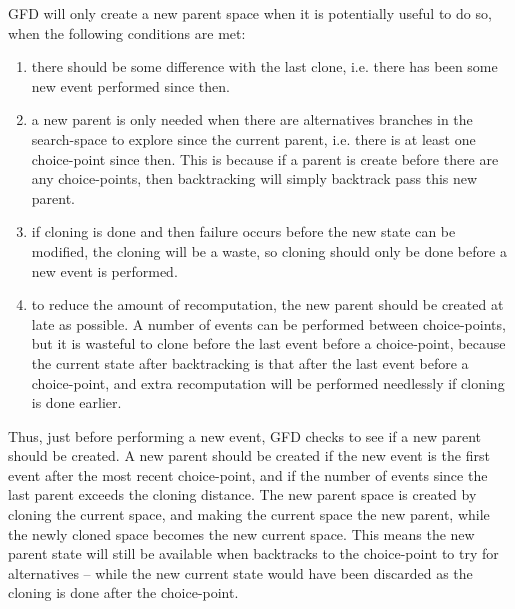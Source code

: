 GFD will only create a new parent space when it is potentially useful
 to do so, when the following conditions are met:

\begin{enumerate}
\item there should be some difference with the last clone, i.e. 
there has been some new event performed since then. 
\item a new parent is only needed when there are alternatives branches 
in the search-space to explore since the current parent, i.e.
there is at least one choice-point since then. This is because if a
 parent is create before there are any choice-points, then backtracking will simply 
backtrack pass this new parent.
\item if cloning is done and then failure
occurs before the new state can be modified, the cloning will be a waste, so
cloning should only be done before a new event is performed.
\item to reduce the amount of recomputation, the new parent should be created
at late as possible. A number of events can be performed between choice-points,
but it is wasteful to clone before the last event before a choice-point, 
because the current state after backtracking is that after the last event before a choice-point,
and extra recomputation will be performed needlessly if cloning is done earlier.
\end{enumerate}

Thus, just before performing a new event, GFD checks to see if a new
 parent should be created. A new parent should be created if
the new event is the first event after 
the most recent choice-point, and if
the number of events since the last parent exceeds the cloning distance.
The new parent space is created by cloning the current space, and
making the current space the new parent, while the newly cloned space
 becomes the new current space. This means the new parent state will
still be available when \eclipse backtracks to the choice-point to try 
for alternatives -- while the new current state would have been
 discarded as the cloning is done after the choice-point.

